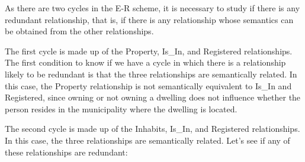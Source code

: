 \documentclass{article}
\begin{document}
As there are two cycles in the E-R scheme, it is necessary to study if there is any redundant relationship, that is, if there is any relationship whose semantics can be obtained from the other relationships.

The first cycle is made up of the Property, Is\_In, and Registered relationships.  The first condition to know if we have a cycle in which there is a relationship likely to be redundant is that the three relationships are semantically related.  In this case, the Property relationship is not semantically equivalent to Is\_In and Registered, since owning or not owning a dwelling does not influence whether the person resides in the municipality where the dwelling is located.

The second cycle is made up of the Inhabits, Is\_In, and Registered relationships.  In this case, the three relationships are semantically related.  Let's see if any of these relationships are redundant:
\end{document}
